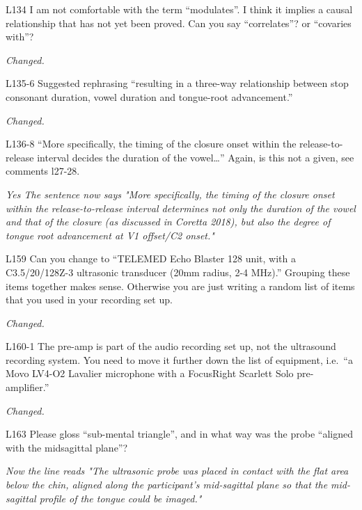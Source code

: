 \documentclass[]{article}
\begin{document}
L134 I am not comfortable with the term ``modulates''. I think it
implies a causal relationship that has not yet been proved. Can you say
``correlates''? or ``covaries with''?

\begin{adjustwidth}{1cm}{} \textit{
Changed.
} \end{adjustwidth}

L135-6 Suggested rephrasing ``resulting in a three-way relationship
between stop consonant duration, vowel duration and tongue-root
advancement.''

\begin{adjustwidth}{1cm}{} \textit{
Changed.
} \end{adjustwidth}

L136-8 ``More specifically, the timing of the closure onset within the
release-to-release interval decides the duration of the vowel\ldots{}''
Again, is this not a given, see comments l27-28.

\begin{adjustwidth}{1cm}{} \textit{
Yes The sentence now says "More specifically, the timing of the closure onset within the release-to-release interval determines not only the duration of the vowel and that of the closure (as discussed in Coretta 2018), but also the degree of tongue root advancement at V1 offset/C2 onset."
} \end{adjustwidth}

L159 Can you change to ``TELEMED Echo Blaster 128 unit, with a
C3.5/20/128Z-3 ultrasonic transducer (20mm radius, 2-4 MHz).'' Grouping
these items together makes sense. Otherwise you are just writing a
random list of items that you used in your recording set up.

\begin{adjustwidth}{1cm}{} \textit{
Changed.
} \end{adjustwidth}

L160-1 The pre-amp is part of the audio recording set up, not the
ultrasound recording system. You need to move it further down the list
of equipment, i.e.~``a Movo LV4-O2 Lavalier microphone with a FocusRight
Scarlett Solo pre-amplifier.''

\begin{adjustwidth}{1cm}{} \textit{
Changed.
} \end{adjustwidth}

L163 Please gloss ``sub-mental triangle'', and in what way was the probe
``aligned with the midsagittal plane''?

\begin{adjustwidth}{1cm}{} \textit{
Now the line reads "The ultrasonic probe was placed in contact with the flat area below the chin, aligned along the participant's mid-sagittal plane so that the mid-sagittal profile of the tongue could be imaged."
} \end{adjustwidth}
\end{document}

